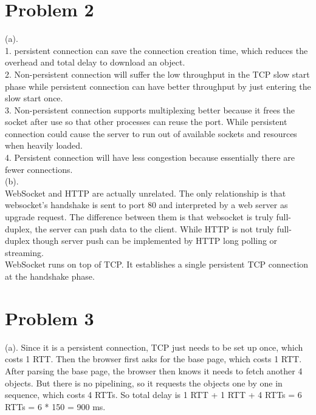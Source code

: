 \documentclass[titlepage, paper=a4, fontsize=11pt]{scrartcl} %
\numberwithin{equation}{section} %
\numberwithin{table}{section} %
\begin{document}
\section*{Problem 2}
(a). \\
1. persistent connection can save the connection creation time, which reduces the overhead and total delay to download an object. \\
2. Non-persistent connection will suffer the low throughput in the TCP slow start phase while persistent connection can have better throughput by just entering the slow start once. \\
3. Non-persistent connection supports multiplexing better because it frees the socket after use so that other processes can reuse the port. While persistent connection could cause the server to run out of available sockets and resources when heavily loaded. \\
4. Persistent connection will have less congestion because essentially there are fewer connections. \\

(b). \\
WebSocket and HTTP are actually unrelated. The only relationship is that websocket's handshake is sent to port 80 and interpreted by a web server as upgrade request. The difference between them is that websocket is truly full-duplex, the server can push data to the client. While HTTP is not truly full-duplex though server push can be implemented by HTTP long polling or streaming. \\
WebSocket runs on top of TCP. It establishes a single persistent TCP connection at the handshake phase.
\\


\section*{Problem 3}
(a).
Since it is a persistent connection, TCP just needs to be set up once, which costs 1 RTT. Then the browser first asks for the base page, which costs 1 RTT. After parsing the base page, the browser then knows it needs to fetch another 4 objects. But there is no pipelining, so it requests the objects one by one in sequence, which costs 4 RTTs. So total delay is 1 RTT + 1 RTT + 4 RTTs = 6 RTTs = 6 * 150 = 900 ms. \\
\end{document}

